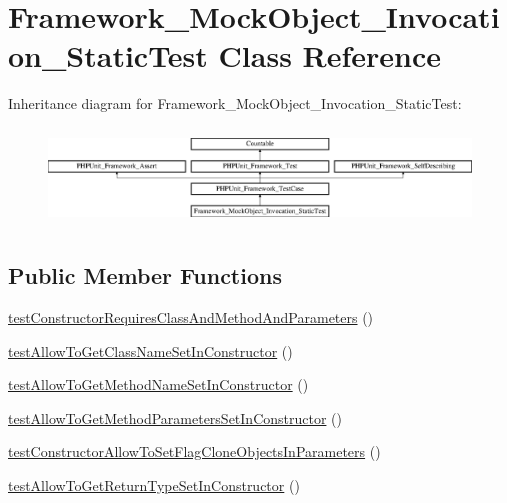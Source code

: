 \hypertarget{class_framework___mock_object___invocation___static_test}{}\section{Framework\+\_\+\+Mock\+Object\+\_\+\+Invocation\+\_\+\+Static\+Test Class Reference}
\label{class_framework___mock_object___invocation___static_test}
Inheritance diagram for Framework\+\_\+\+Mock\+Object\+\_\+\+Invocation\+\_\+\+Static\+Test\+:\begin{figure}[H]
\begin{center}
\leavevmode
\includegraphics[height=2.629108cm]{class_framework___mock_object___invocation___static_test}
\end{center}
\end{figure}
\subsection*{Public Member Functions}
\begin{DoxyCompactItemize}
\item 
\mbox{\hyperlink{class_framework___mock_object___invocation___static_test_a77593633568b990254b2aeff5c6197c0}{test\+Constructor\+Requires\+Class\+And\+Method\+And\+Parameters}} ()
\item 
\mbox{\hyperlink{class_framework___mock_object___invocation___static_test_a6b53121d62958db6380429d23751e7b9}{test\+Allow\+To\+Get\+Class\+Name\+Set\+In\+Constructor}} ()
\item 
\mbox{\hyperlink{class_framework___mock_object___invocation___static_test_a10322e7e1e618ffa8635cccf6ff5e730}{test\+Allow\+To\+Get\+Method\+Name\+Set\+In\+Constructor}} ()
\item 
\mbox{\hyperlink{class_framework___mock_object___invocation___static_test_a71c90e01464d3f91cd7801f52071bd0a}{test\+Allow\+To\+Get\+Method\+Parameters\+Set\+In\+Constructor}} ()
\item 
\mbox{\hyperlink{class_framework___mock_object___invocation___static_test_ab14af6e75ae573bf07de8502847f7daa}{test\+Constructor\+Allow\+To\+Set\+Flag\+Clone\+Objects\+In\+Parameters}} ()
\item 
\mbox{\hyperlink{class_framework___mock_object___invocation___static_test_ac2bd1b51e0124b7ad3863d15c052b0f9}{test\+Allow\+To\+Get\+Return\+Type\+Set\+In\+Constructor}} ()
\end{DoxyCompactItemize}
